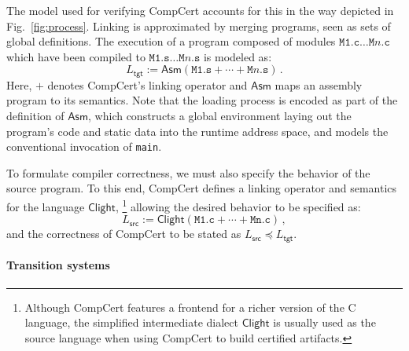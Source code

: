 \documentclass[acmsmall,authordraft]{acmart}
\newcommand{\kw}[1]{\ensuremath{ \mathsf{#1} }}
\newcommand{\refby}{\preceq}
\begin{document}
The model used for verifying CompCert accounts for
this in the way
depicted in Fig.~\ref{fig:process}.
Linking is approximated by
merging programs, seen as sets of global definitions.
The execution
of a program composed of modules
$\texttt{M1.c} \ldots \texttt{M$n$.c}$
which have been compiled to
$\texttt{M1.s} \ldots \texttt{M$n$.s}$
is modeled as:
\[
    L_\kw{tgt} :=
    \kw{Asm}(\texttt{M1.s} +
             \cdots +
             \texttt{M$n$.s}) \,.
\]
Here,
$+$ denotes CompCert's linking operator and
$\kw{Asm}$ maps an assembly program to its semantics.
Note that the loading process is encoded
as part of the definition of $\kw{Asm}$,
which constructs a global environment
laying out the program's code and static data
into the runtime address space,
and models the conventional invocation of \texttt{main}.

To formulate compiler correctness,
we must also specify the behavior of the source program.
To this end,
CompCert defines a linking operator
and semantics
for the language $\kw{Clight}$,%
\footnote{
  Although CompCert features a frontend for a richer version
  of the C language,
  the simplified intermediate dialect \kw{Clight}
  is usually used as the source language
  when using CompCert to build certified artifacts.
}
allowing the desired behavior to be specified as:
\[
    L_\kw{src} :=
    \kw{Clight}(\texttt{M1.c} + \cdots + \texttt{Mn.c}) \,,
\]
and the correctness of CompCert
to be stated as $L_\kw{src} \refby L_\kw{tgt}$.

\paragraph{Transition systems} %
\end{document}
